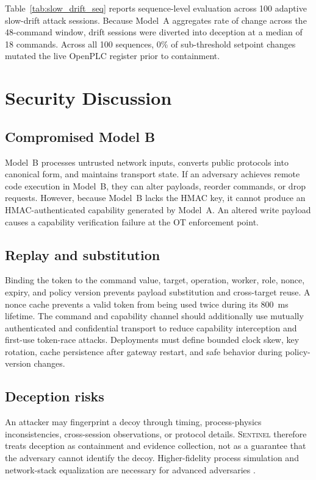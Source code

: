 \documentclass[journal]{IEEEtran}
\newcommand{\sentinel}{\textsc{Sentinel}}
\newcommand{\modela}{Model~A}
\begin{document}
Table~\ref{tab:slow_drift_seq} reports sequence-level evaluation across 100 adaptive slow-drift attack sessions. Because \modela{} aggregates rate of change across the 48-command window, drift sessions were diverted into deception at a median of 18 commands. Across all 100 sequences, 0\% of sub-threshold setpoint changes mutated the live OpenPLC register prior to containment.

\section{Security Discussion}
\subsection{Compromised Model B}
Model~B processes untrusted network inputs, converts public protocols into canonical form, and maintains transport state. If an adversary achieves remote code execution in Model~B, they can alter payloads, reorder commands, or drop requests. However, because Model~B lacks the HMAC key, it cannot produce an HMAC-authenticated capability generated by Model~A. An altered write payload causes a capability verification failure at the OT enforcement point.

\subsection{Replay and substitution}
Binding the token to the command value, target, operation, worker, role, nonce, expiry, and policy version prevents payload substitution and cross-target reuse. A nonce cache prevents a valid token from being used twice during its 800~ms lifetime. The command and capability channel should additionally use mutually authenticated and confidential transport to reduce capability interception and first-use token-race attacks. Deployments must define bounded clock skew, key rotation, cache persistence after gateway restart, and safe behavior during policy-version changes.

\subsection{Deception risks}
An attacker may fingerprint a decoy through timing, process-physics inconsistencies, cross-session observations, or protocol details. \sentinel{} therefore treats deception as containment and evidence collection, not as a guarantee that the adversary cannot identify the decoy. Higher-fidelity process simulation and network-stack equalization are necessary for advanced adversaries \cite{time_to_lie}.
\end{document}
